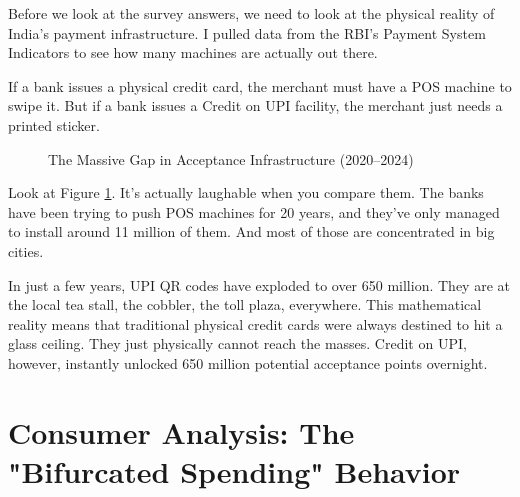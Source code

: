 Before we look at the survey answers, we need to look at the physical reality of India's payment infrastructure. I pulled data from the RBI's Payment System Indicators to see how many machines are actually out there.

If a bank issues a physical credit card, the merchant must have a POS machine to swipe it. But if a bank issues a Credit on UPI facility, the merchant just needs a  printed sticker.

\begin{figure}[H]
\centering
{}
\caption{The Massive Gap in Acceptance Infrastructure (2020--2024)}
\label{fig:infra_gap}
\end{figure}

Look at Figure \ref{fig:infra_gap}. It's actually laughable when you compare them. The banks have been trying to push POS machines for 20 years, and they've only managed to install around 11 million of them. And most of those are concentrated in big cities.

In just a few years, UPI QR codes have exploded to over 650 million. They are at the local tea stall, the cobbler, the toll plaza, everywhere. This mathematical reality means that traditional physical credit cards were always destined to hit a glass ceiling. They just physically cannot reach the masses. Credit on UPI, however, instantly unlocked 650 million potential acceptance points overnight.

\section{Consumer Analysis: The "Bifurcated Spending" Behavior}

